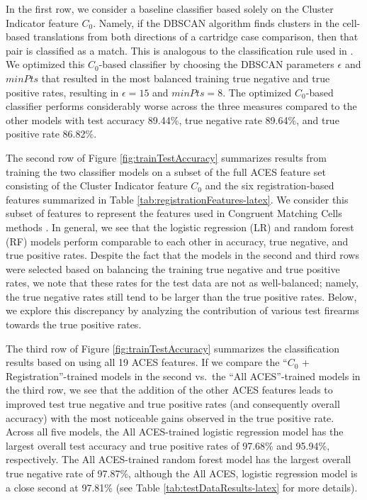 \documentclass[11pt,]{isuthesis}
\begin{document}
In the first row, we consider a baseline classifier based solely on the Cluster Indicator feature \(C_0\).
Namely, if the DBSCAN algorithm finds clusters in the cell-based translations from both directions of a cartridge case comparison, then that pair is classified as a match.
This is analogous to the classification rule used in \citet{zhang_convergence_2021}.
We optimized this \(C_0\)-based classifier by choosing the DBSCAN parameters \(\epsilon\) and \(minPts\) that resulted in the most balanced training true negative and true positive rates, resulting in \(\epsilon = 15\) and \(minPts = 8\).
The optimized \(C_0\)-based classifier performs considerably worse across the three measures compared to the other models with test accuracy 89.44\%, true negative rate 89.64\%, and true positive rate 86.82\%.

The second row of Figure \ref{fig:trainTestAccuracy} summarizes results from training the two classifier models on a subset of the full ACES feature set consisting of the Cluster Indicator feature \(C_0\) and the six registration-based features summarized in Table \ref{tab:registrationFeatures-latex}.
We consider this subset of features to represent the features used in Congruent Matching Cells methods \citep{song_proposed_2013, zhang_convergence_2021}.
In general, we see that the logistic regression (LR) and random forest (RF) models perform comparable to each other in accuracy, true negative, and true positive rates.
Despite the fact that the models in the second and third rows were selected based on balancing the training true negative and true positive rates, we note that these rates for the test data are not as well-balanced; namely, the true negative rates still tend to be larger than the true positive rates.
Below, we explore this discrepancy by analyzing the contribution of various test firearms towards the true positive rates.

The third row of Figure \ref{fig:trainTestAccuracy} summarizes the classification results based on using all 19 ACES features.
If we compare the ``\(C_0\) + Registration''-trained models in the second vs.~the ``All ACES''-trained models in the third row, we see that the addition of the other ACES features leads to improved test true negative and true positive rates (and consequently overall accuracy) with the most noticeable gains observed in the true positive rate.
Across all five models, the All ACES-trained logistic regression model has the largest overall test accuracy and true positive rates of 97.68\% and 95.94\%, respectively.
The All ACES-trained random forest model has the largest overall true negative rate of 97.87\%, although the All ACES, logistic regression model is a close second at 97.81\% (see Table \ref{tab:testDataResults-latex} for more details).
\end{document}

